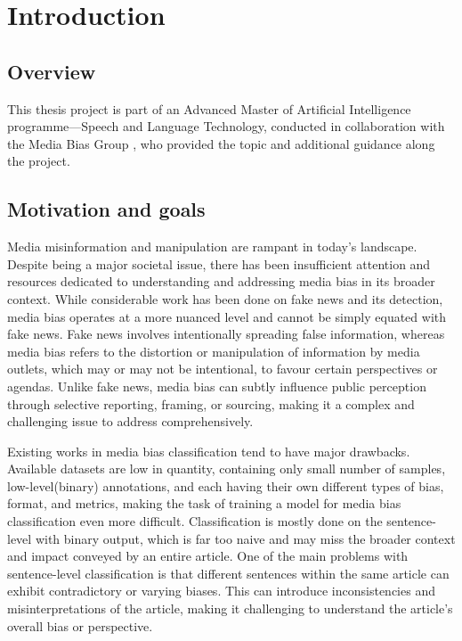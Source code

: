\chapter{Introduction}
\label{cha:1}

\section{Overview}

This thesis project is part of an Advanced Master of Artificial Intelligence programme—Speech and Language Technology, conducted in collaboration with the Media Bias Group \cite{media-bias-group}, who provided the topic and additional guidance along the project.

\section{Motivation and goals}

Media misinformation and manipulation are rampant in today's landscape. Despite being a major societal issue, there has been insufficient attention and resources dedicated to understanding and addressing media bias in its broader context. While considerable work has been done on fake news and its detection, media bias operates at a more nuanced level and cannot be simply equated with fake news. Fake news involves intentionally spreading false information, whereas media bias refers to the distortion or manipulation of information by media outlets, which may or may not be intentional, to favour certain perspectives or agendas. Unlike fake news, media bias can subtly influence public perception through selective reporting, framing, or sourcing, making it a complex and challenging issue to address comprehensively.

Existing works in media bias classification tend to have major drawbacks. Available datasets are low in quantity, containing only small number of samples, low-level(binary) annotations, and each having their own different types of bias, format, and metrics, making the task of training a model for media bias classification even more difficult. Classification is mostly done on the sentence-level with binary output, which is far too naive and may miss the broader context and impact conveyed by an entire article. One of the main problems with sentence-level classification is that different sentences within the same article can exhibit contradictory or varying biases. This can introduce inconsistencies and misinterpretations of the article, making it challenging to understand the article's overall bias or perspective.

